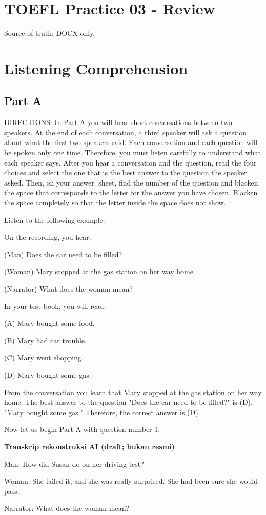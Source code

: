\documentclass[12pt]{article}
\begin{document}
\section*{TOEFL Practice 03 - Review}
Source of truth: DOCX only.
\section*{Listening Comprehension}
\subsection*{Part A}
DIRECTIONS: In Part A you will hear short conversations between two speakers. At the end of each conversation, a third speaker will ask a question about what the first two speakers said. Each conversation and each question will be spoken only one time. Therefore, you must listen carefully to understand what each speaker says. After you hear a conversation and the question, read the four choices and select the one that is the best answer to the question the speaker asked. Then, on your answer. sheet, find the number of the question and blacken the space that corresponds to the letter for the answer you have chosen. Blacken the space completely so that the letter inside the space does not show.\par
\begin{exampleblock}
Listen to the following example.\par
On the recording, you hear:\par
(Man) Does the car need to be filled?\par
(Woman) Mary stopped at the gas station on her way home.\par
(Narrator) What does the woman mean?\par
In your test book, you will read:\par
(A) Mary bought some food.\par
(B) Mary had car trouble.\par
(C) Mary went shopping.\par
(D) Mary bought some gas.\par
From the conversation you learn that Mary stopped at the gas station on her way home. The best answer to the question "Does the car need to be filled?" is (D), "Mary bought some gas." Therefore, the correct answer is (D).\par
Now let us begin Part A with question number 1.\par
\end{exampleblock}
\begin{exampleblock}
\textbf{Transkrip rekonstruksi AI (draft; bukan resmi)}\par
Man: How did Susan do on her driving test?\par
Woman: She failed it, and she was really surprised. She had been sure she would pass.\par
Narrator: What does the woman mean?\par
\end{exampleblock}
\end{document}
